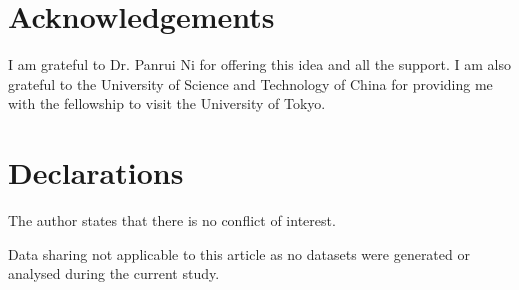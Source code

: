 \documentclass[preprint]{elsarticle}
\numberwithin{equation}{section}
\begin{document}
\section*{Acknowledgements}

I am grateful to Dr. Panrui Ni for offering this idea and all the support. I am also grateful to the University of Science and Technology of China for providing me with the fellowship to visit the University of Tokyo.

\section*{Declarations}

 The author states that there is no conflict of interest.

\medskip

 Data sharing not applicable to this article as no datasets were generated or analysed during the current study.

\end{document}
